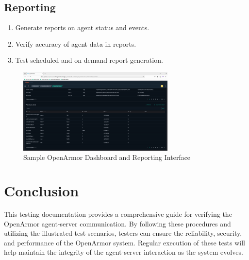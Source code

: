 \subsection{Reporting}
\begin{enumerate}
    \item Generate reports on agent status and events.
    \item Verify accuracy of agent data in reports.
    \item Test scheduled and on-demand report generation.
\end{enumerate}

\begin{figure}[h]
    \centering
    \includegraphics[width=0.7\textwidth]{openarmor-agent/9.png}
    \caption{Sample OpenArmor Dashboard and Reporting Interface}
    \label{fig:dashboard-reporting}
\end{figure}

\section{Conclusion}
This testing documentation provides a comprehensive guide for verifying the OpenArmor agent-server communication. By following these procedures and utilizing the illustrated test scenarios, testers can ensure the reliability, security, and performance of the OpenArmor system. Regular execution of these tests will help maintain the integrity of the agent-server interaction as the system evolves.